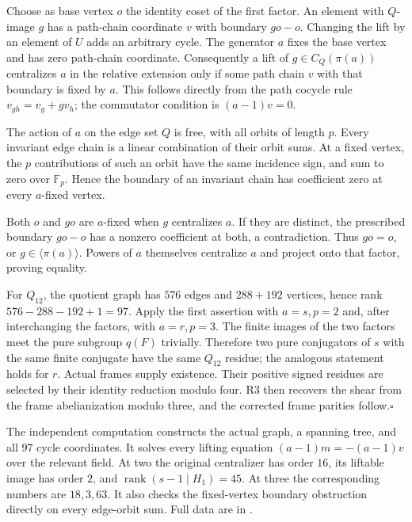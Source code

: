 Choose as base vertex $o$ the identity coset of the first factor.
An element with $Q$-image $g$ has a path-chain coordinate $v$
with boundary $g o-o$.  Changing the lift by an element of $U$
adds an arbitrary cycle.  The generator $a$ fixes the base vertex
and has zero path-chain coordinate.  Consequently a lift of
$g\in C_Q(\pi(a))$ centralizes $a$ in the relative extension
only if some path chain $v$ with that boundary is fixed by $a$.
This follows directly from the path cocycle rule
$v_{gh}=v_g+g v_h$; the commutator condition is
$(a-1)v=0$.

The action of $a$ on the edge set $Q$ is free, with all orbits
of length $p$.  Every invariant edge chain is a linear combination
of their orbit sums.  At a fixed vertex, the $p$ contributions
of such an orbit have the same incidence sign, and sum to zero
over $\mathbb F_p$.  Hence the boundary of an invariant chain
has coefficient zero at every $a$-fixed vertex.

Both $o$ and $g o$ are $a$-fixed when $g$ centralizes $a$.
If they are distinct, the prescribed boundary $g o-o$ has a
nonzero coefficient at both, a contradiction.  Thus $g o=o$,
or $g\in\langle\pi(a)\rangle$.  Powers of $a$ themselves
centralize $a$ and project onto that factor, proving equality.

For $Q_{12}$, the quotient graph has $576$ edges and
$288+192$ vertices, hence rank $576-288-192+1=97$.
Apply the first assertion with $a=s,p=2$ and, after interchanging
the factors, with $a=r,p=3$.  The finite images of the two
factors meet the pure subgroup $q(F)$ trivially.  Therefore two
pure conjugators of $s$ with the same finite conjugate have the
same $Q_{12}$ residue; the analogous statement holds for $r$.
Actual frames supply existence.  Their positive signed residues
are selected by their identity reduction modulo four.  R3 then
recovers the shear from the frame abelianization modulo three,
and the corrected frame parities follow.\hfill$\square$

The independent computation
constructs the actual graph, a spanning tree, and all $97$ cycle
coordinates.  It solves every lifting equation
$(a-1)m=-(a-1)v$ over the relevant field.  At two the original
centralizer has order $16$, its liftable image has order $2$,
and $\operatorname{rank}(s-1\mid H_1)=45$.
At three the corresponding numbers are $18,3,63$.
It also checks the fixed-vertex boundary obstruction directly
on every edge-orbit sum.  Full data are in
.

